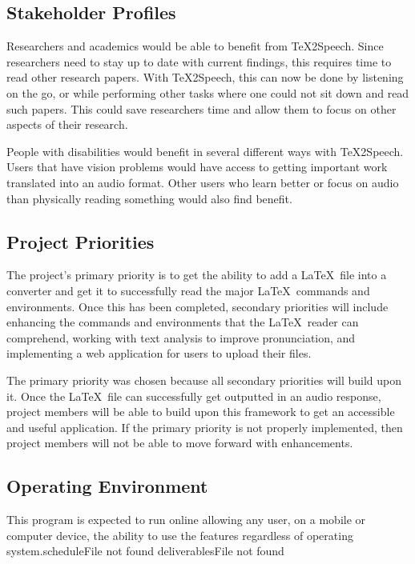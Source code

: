 \documentclass[letterpaper,12pt]{article}
\begin{document}
\subsection{Stakeholder Profiles}
\par
Researchers and academics would be able to benefit from \TeX 2Speech. Since researchers need to stay up to date with current findings, this requires time to read other research papers. With \TeX 2Speech, this can now be done by listening on the go, or while performing other tasks where one could not sit down and read such papers. This could save researchers time and allow them to focus on other aspects of their research.\\
\par
\noindent People with disabilities would benefit in several different ways with \TeX 2Speech. Users that have vision problems would have access to getting important work translated into an audio format. Other users who learn better or focus on audio than physically reading something would also find benefit.

\subsection{Project Priorities}
\par
The project’s primary priority is to get the ability to add a \LaTeX\ file into a converter and get it to successfully read the major \LaTeX\ commands and environments. Once this has been completed, secondary priorities will include enhancing the commands and environments that the \LaTeX\ reader can comprehend, working with text analysis to improve pronunciation, and implementing a web application for users to upload their files.\\
\par
\noindent The primary priority was chosen because all secondary priorities will build upon it. Once the \LaTeX\ file can successfully get outputted in an audio response, project members will be able to build upon this framework to get an accessible and useful application. If the primary priority is not properly implemented, then project members will not be able to move forward with enhancements.

\subsection{Operating Environment}
This program is expected to run online allowing any user, on a mobile or computer device, the ability to use the features regardless of operating system.scheduleFile not found 
deliverablesFile not found 
\end{document}
